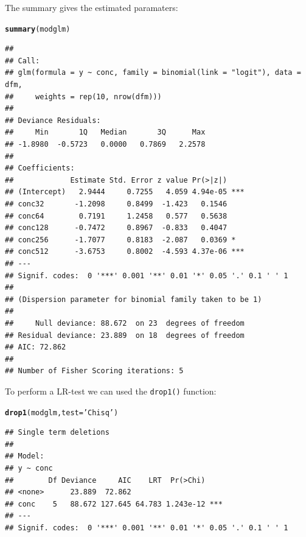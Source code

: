\documentclass{scrartcl}\usepackage[]{graphicx}\usepackage[]{color}
\makeatletter
\newcommand{\hlstr}[1]{\textcolor[rgb]{0.192,0.494,0.8}{#1}}%
\newcommand{\hlstd}[1]{\textcolor[rgb]{0.345,0.345,0.345}{#1}}%
\newcommand{\hlkwc}[1]{\textcolor[rgb]{0.333,0.667,0.333}{#1}}%
\newcommand{\hlkwd}[1]{\textcolor[rgb]{0.737,0.353,0.396}{\textbf{#1}}}%
\newenvironment{kframe}{%
 \def\at@end@of@kframe{}%
 \ifinner\ifhmode%
  \def\at@end@of@kframe{\end{minipage}}%
  \begin{minipage}{\columnwidth}%
 \fi\fi%
 \def\FrameCommand##1{\hskip\@totalleftmargin \hskip-\fboxsep
 \colorbox{shadecolor}{##1}\hskip-\fboxsep
     \hskip-\linewidth \hskip-\@totalleftmargin \hskip\columnwidth}%
 \MakeFramed {\advance\hsize-\width
   \@totalleftmargin\z@ \linewidth\hsize
   \@setminipage}}%
 {\par\unskip\endMakeFramed%
 \at@end@of@kframe}
\newenvironment{knitrout}{}{} %
\makeatother
\begin{document}
The summary gives the estimated paramaters:
\begin{knitrout}
\color{fgcolor}\begin{kframe}
\begin{alltt}
\hlkwd{summary}\hlstd{(modglm)}
\end{alltt}
\begin{verbatim}
## 
## Call:
## glm(formula = y ~ conc, family = binomial(link = "logit"), data = dfm, 
##     weights = rep(10, nrow(dfm)))
## 
## Deviance Residuals: 
##     Min       1Q   Median       3Q      Max  
## -1.8980  -0.5723   0.0000   0.7869   2.2578  
## 
## Coefficients:
##             Estimate Std. Error z value Pr(>|z|)    
## (Intercept)   2.9444     0.7255   4.059 4.94e-05 ***
## conc32       -1.2098     0.8499  -1.423   0.1546    
## conc64        0.7191     1.2458   0.577   0.5638    
## conc128      -0.7472     0.8967  -0.833   0.4047    
## conc256      -1.7077     0.8183  -2.087   0.0369 *  
## conc512      -3.6753     0.8002  -4.593 4.37e-06 ***
## ---
## Signif. codes:  0 '***' 0.001 '**' 0.01 '*' 0.05 '.' 0.1 ' ' 1
## 
## (Dispersion parameter for binomial family taken to be 1)
## 
##     Null deviance: 88.672  on 23  degrees of freedom
## Residual deviance: 23.889  on 18  degrees of freedom
## AIC: 72.862
## 
## Number of Fisher Scoring iterations: 5
\end{verbatim}
\end{kframe}
\end{knitrout}

To perform a LR-test we can used the \texttt{drop1()} function:
\begin{knitrout}
\color{fgcolor}\begin{kframe}
\begin{alltt}
\hlkwd{drop1}\hlstd{(modglm,} \hlkwc{test} \hlstd{=} \hlstr{'Chisq'}\hlstd{)}
\end{alltt}
\begin{verbatim}
## Single term deletions
## 
## Model:
## y ~ conc
##        Df Deviance     AIC    LRT  Pr(>Chi)    
## <none>      23.889  72.862                     
## conc    5   88.672 127.645 64.783 1.243e-12 ***
## ---
## Signif. codes:  0 '***' 0.001 '**' 0.01 '*' 0.05 '.' 0.1 ' ' 1
\end{verbatim}
\end{kframe}
\end{knitrout}
\end{document}
